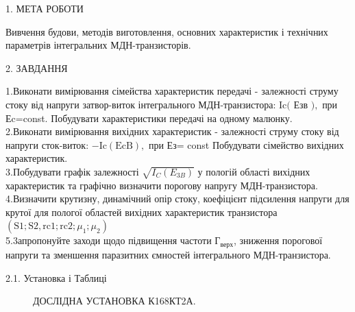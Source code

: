 \documentclass[a4paper,14pt]{extreport}
\begin{document}
\begin{center}1. МЕТА РОБОТИ\\ \end{center}

Вивчення будови, методів виготовлення, основних характеристик і технічних параметрів інтегральних МДН-транзисторів.

\begin{center}2. ЗАВДАННЯ\\ \end{center}


1.Виконати вимірювання сімейства характеристик передачі - залежності струму стоку від напруги затвор-виток інтегрального МДН-транзистора: $\mathrm{Ic}($ Езв $),$ при Еc=const. Побудувати характеристики передачі на одному малюнку.\\

2.Виконати вимірювання вихідних характеристик - залежності струму стоку від напруги сток-виток: $-\mathrm{Ic}(\mathrm{EcB}),$ при Ез= const Побудувати сімейство вихідних характеристик.\\

3.Побудувати графік залежності $\sqrt{I_{C}\left(E_{3 B}\right)}$ у пологій області вихідних характеристик та графічно визначити порогову напругу МДН-транзистора.\\

4.Визначити крутизну, динамічний опір стоку, коефіцієнт підсилення напруги для крутої для пологої областей вихідних характеристик транзистора $\left(\mathrm{S} 1 ; \mathrm{S} 2, \mathrm{rc} 1 ; \mathrm{rc} 2 ; \mu_{1} ; \mu_{2}\right)$\\

5.3апропонуйте заходи щодо підвищення частоти Г$_{\text{верх}}$, зниження порогової напруги та зменшення паразитних ємностей інтегрального МДН-транзистора.\\

\newpage
\begin{center}2.1. Установка і Таблиці\\ \end{center}
\begin{figure}[h]
\caption{ДОСЛІДНА УСТАНОВКА К168КТ2А.}
\label{ris1}
\end{figure}
\end{document}
